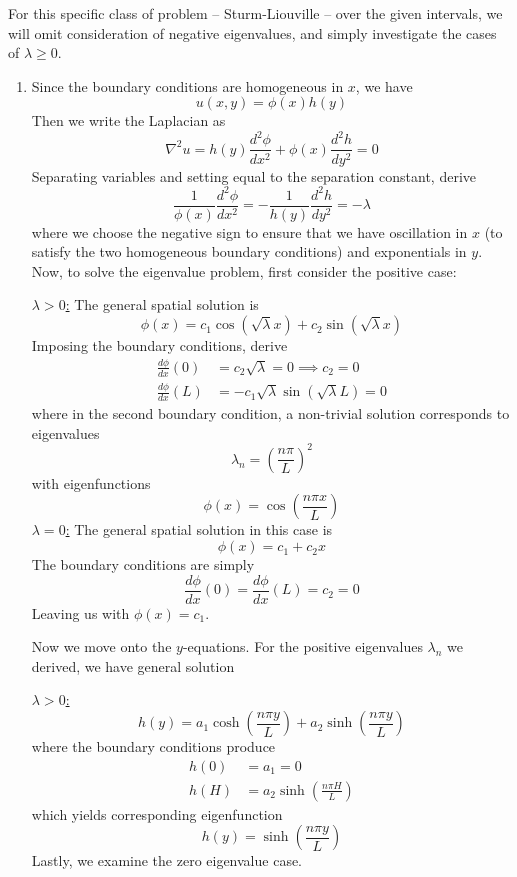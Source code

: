 \documentclass[a4paper]{article}
\begin{document}
For this specific class of problem -- Sturm-Liouville -- over the given intervals, we will omit consideration of negative eigenvalues, and simply investigate the cases of \( \lambda \ge 0 \).

\begin{enumerate}[label=(\alph*)]
	\item Since the boundary conditions are homogeneous in \( x \), we have
	\[
		u \!\left( x,y \right) = \phi \!\left( x \right)h \!\left( y \right)
	\]
	Then we write the Laplacian as 
	\[
		\nabla^{2}u = h \!\left( y \right)\frac{d^2 \phi}{d x^2} + \phi \!\left( x \right)\frac{d^2 h}{d y^2} = 0	
	\]
	Separating variables and setting equal to the separation constant, derive
	\[
		\frac{1}{\phi \!\left( x \right)}\frac{d^2 \phi}{d x^2} = -\frac{1}{h \!\left( y \right)}\frac{d^2 h}{d y^2} = -\lambda
	\]
	where we choose the negative sign to ensure that we have oscillation in \( x \) (to satisfy the two homogeneous boundary conditions) and exponentials in \( y \). Now, to solve the eigenvalue problem, first consider the positive case:

	\underline{\( \lambda > 0 \):} The general spatial solution is
	\[
		\phi \!\left( x \right) = c_{1}\cos\!\left(\sqrt{\lambda}x\right) + c_{2}\sin\!\left(\sqrt{\lambda}x\right) 
	\]
	Imposing the boundary conditions, derive
	\begin{align*}
		\frac{d \phi}{d x}\!\left( 0 \right) & = c_{2}\sqrt{\lambda} = 0 \implies c_{2} = 0 \\
		\frac{d \phi}{d x}\!\left( L \right) & = -c_{1}\sqrt{\lambda}\sin\!\left(\sqrt{\lambda}L\right) = 0 
	\end{align*}
	where in the second boundary condition, a non-trivial solution corresponds to eigenvalues
	\[
		\lambda_{n} = \!\left( \frac{n \pi}{L} \right)^{2} 
	\]
	with eigenfunctions
	\[
		\phi \!\left( x \right) = \cos\!\left(\frac{n \pi x}{L}\right) 
	\]
	\underline{\( \lambda = 0 \):} The general spatial solution in this case is
	\[
		\phi \!\left( x \right) = c_{1} + c_{2}x 
	\]
	The boundary conditions are simply
	\[
		\frac{d \phi}{d x}\!\left( 0 \right) = \frac{d \phi}{d x}\!\left( L \right) = c_{2} = 0 
	\]
	Leaving us with \( \phi \!\left( x \right) = c_{1} \).

	Now we move onto the \( y \)-equations. For the positive eigenvalues \( \lambda_{n} \) we derived, we have general solution

	\underline{\( \lambda > 0 \):}
	\[
		h \!\left( y \right) = a_{1}\cosh\!\left(\frac{n \pi y}{L}\right) + a_{2}\sinh\!\left(\frac{n \pi y}{L}\right) 
	\]
	where the boundary conditions produce
	\begin{align*}
		h \!\left( 0 \right) & = a_{1} = 0 \\
		h \!\left( H \right) & = a_{2}\sinh\!\left(\frac{n \pi H}{L}\right)
	\end{align*}
	which yields corresponding eigenfunction
	\[
		h \!\left( y \right) = \sinh\!\left(\frac{n \pi y}{L}\right) 
	\]
	Lastly, we examine the zero eigenvalue case.


\end{enumerate}
\end{document}
